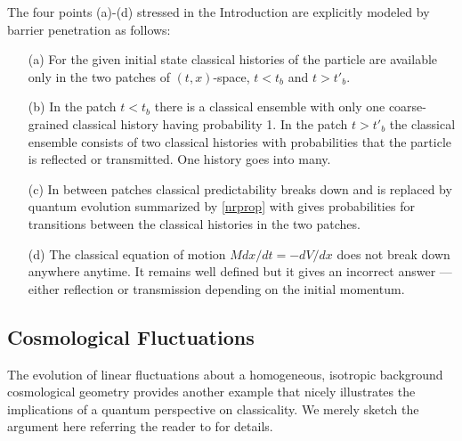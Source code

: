 \documentclass[prd,floats,superscriptaddress,eqsecnum,floatfix,nofootinbib,12pt]{revtex4}
\def\qf{}
\def\jf{}
\def\j2{}
\begin{document}
{{{{{\qf The four points (a)-(d) stressed in the Introduction are explicitly modeled by barrier penetration{\j2 as follows:}

 \begin{enumerate}
 
 \item[(a)] For the given initial  state classical histories of the particle are available only in the two patches of $(t,x)$-space, $t<t_b$ and $t>t'_b$.
 
 \item[(b)] In the patch $t<t_b$ there is a classical ensemble with  only one coarse-grained classical history having probability 1. In the patch $t>t'_b$ the classical ensemble consists of two classical histories with probabilities that the particle is reflected or transmitted. One {\j2 history} goes into many.
 
 \item [(c)] In between patches classical predictability breaks down and is replaced by quantum evolution summarized by \eqref{nrprop} with gives probabilities for transitions between the classical histories in the two patches. 
 
 \item[(d)] The classical equation of motion $Mdx/dt=-dV/dx$ does not break down{\j2 anywhere anytime}. It remains well defined but it  gives an incorrect answer --- either reflection or transmission depending on the initial momentum. 
 
  \end{enumerate}
 }

\subsection{Cosmological Fluctuations}
\label{flucts}

The evolution of linear fluctuations about a homogeneous, isotropic background cosmological geometry provides another {\jf example that nicely illustrates the implications of a quantum perspective on classicality.}
We merely sketch the argument here referring the reader to \cite{HHH10a} for details.

}}}}
\end{document}
